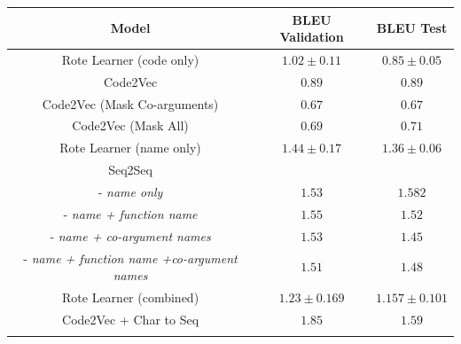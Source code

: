 \begin{table}[!ht]
\begin{center}
\begin{tabular}{ c | c | c }
    Model                             & BLEU Validation & BLEU Test \\
    \hline
    Rote Learner  (code only)         & $ 1.02 \pm  0.11 $ & $ 0.85 \pm 0.05 $ \\
    Code2Vec                          & $ 0.89 $ & $ 0.89 $ \\
    Code2Vec  (Mask Co-arguments)             & $ 0.67 $ & $ 0.67 $ \\
    Code2Vec  (Mask All)             & $ 0.69 $ & $ 0.71 $ \\
    \hline
    \hline
    Rote Learner  (name only)         & $ 1.44 \pm  0.17 $ & $ 1.36 \pm 0.06$ \\
    \hline
    Seq2Seq                             & &   \\
    - \textit{name only}              & $ 1.53 $ & $ 1.582$ \\
    - \textit{name + function name}      & $ 1.55 $ & $ 1.52 $ \\
    - \textit{name + co-argument names}         & $ 1.53 $ & $ 1.45$ \\   
    - \textit{name + function name +co-argument names}     & $ 1.51 $ & $ 1.48$ \\
    \hline
    \hline
    Rote Learner (combined)            & $ 1.23 \pm  0.169 $ & $ 1.157 \pm 0.101 $ \\
    Code2Vec  + Char to Seq            & $ 1.85 $ & $ 1.59 $ \\\\
    \hline



\end{tabular}
\end{center}
\end{table}
